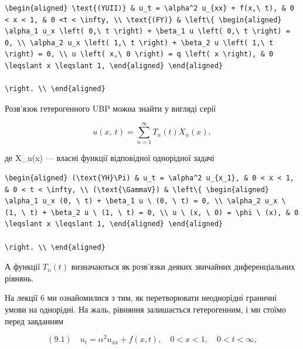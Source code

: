 \documentclass[
  ukrainian,
]{article}
\begin{document}
\begin{verbatim}
\begin{aligned} \text{(YUII)} & u_t = \alpha^2 u_{xx} + f(x,\ t), & 0 < x < 1, & 0 <t < \infty, \\ \text{(FY)} & \left\{ \begin{aligned} \alpha_1 u_x \left( 0,\ t \right) + \beta_1 u \left( 0,\ t \right) = 0, \\ \alpha_2 u_x \left( 1,\ t \right) + \beta_2 u \left( 1,\ t \right) = 0, \\ u \left( x,\ 0 \right) = q \left( x \right), & 0 \leqslant x \leqslant 1, \end{aligned} \end{aligned}

\right. \\ \end{aligned}
\end{verbatim}

Розв'язок гетерогенного UBP можна знайти у вигляді серії

\[
u\left( x,\ t\right) =\sum_{n=1}^{\infty}T_{n}\left( t\right) X_{n}\left( x\right) ,
\]

де X\_n\left(x\right) --- власні функції відповідної однорідної задачі

\begin{verbatim}
\begin{aligned} (\text{YH}\Pi) & u_t = \alpha^2 u_{x_1}, & 0 < x < 1, & 0 < t < \infty, \\ (\text{\GammaV}) & \left\{ \begin{aligned} \alpha_1 u_x (0, \ t) + \beta_1 u \ (0, \ t) = 0, \\ \alpha_2 u_x \ (1, \ t) + \beta_2 u \ (1, \ t) = 0, \\ u \ (x, \ 0) = \phi \ (x), & 0 \leqslant x \leqslant 1, \end{aligned} \end{aligned}

\right. \\ \end{aligned}
\end{verbatim}

А функції \(T_n(t)\) визначаються як розв'язки деяких звичайних
диференціальних рівнянь.

На лекції 6 ми ознайомилися з тим, як перетворювати неоднорідні граничні
умови на однорідні. На жаль, рівняння залишається гетерогенним, і ми
стоїмо перед завданням

\[
(9.1) \quad u_{t} = \alpha^{2} u_{xx} + f(x, t), \quad 0 < x < 1, \quad 0 < t < \infty,
\]
\end{document}
